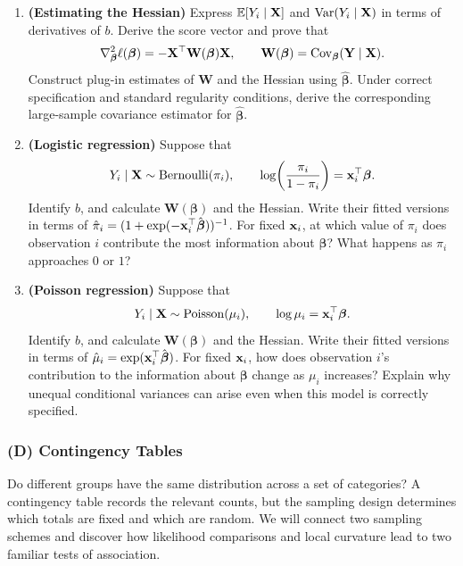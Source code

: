 \begin{enumerate}[label=\textcolor{AccentInk}{\sffamily\bfseries C\arabic*.},
                  ref=C\arabic*,leftmargin=2.65em,labelsep=0.65em,itemsep=1em]
\item \textbf{(Estimating the Hessian)}
Express $\mathbb E[Y_i\mid\mathbf{X}]$ and $\operatorname{Var}(Y_i\mid\mathbf{X})$ in terms
of derivatives of $b$. Derive the score vector and prove that
\[
    \nabla_{\boldsymbol\beta}^2\ell(\boldsymbol\beta)
    =-\mathbf{X}^\top\mathbf W(\boldsymbol\beta)\mathbf{X},
    \qquad
    \mathbf W(\boldsymbol\beta)
    =\operatorname{Cov}_{\boldsymbol\beta}(\mathbf{Y}\mid\mathbf{X}).
\]
Construct plug-in estimates of $\mathbf W$ and the Hessian using
$\hat{\boldsymbol\beta}$. Under correct specification and standard regularity
conditions, derive the corresponding large-sample covariance estimator for
$\hat{\boldsymbol\beta}$.

\item \textbf{(Logistic regression)}
Suppose that
\[
    Y_i\mid\mathbf{X}\sim\operatorname{Bernoulli}(\pi_i),
    \qquad \log\!\left(\frac{\pi_i}{1-\pi_i}\right)
       =\mathbf{x}_i^\top\boldsymbol\beta.
\]
Identify $b$, and calculate $\mathbf W(\boldsymbol\beta)$ and the Hessian.
Write their fitted versions in terms of
$\hat\pi_i=(1+\exp(-\mathbf{x}_i^\top\hat{\boldsymbol\beta}))^{-1}$.
For fixed $\mathbf{x}_i$, at which value of $\pi_i$ does observation $i$ contribute
the most information about $\boldsymbol\beta$? What happens as $\pi_i$
approaches $0$ or $1$?

\item \textbf{(Poisson regression)}
Suppose that
\[
    Y_i\mid\mathbf{X}\sim\operatorname{Poisson}(\mu_i),
    \qquad \log\mu_i=\mathbf{x}_i^\top\boldsymbol\beta.
\]
Identify $b$, and calculate $\mathbf W(\boldsymbol\beta)$ and the Hessian.
Write their fitted versions in terms of
$\hat\mu_i=\exp(\mathbf{x}_i^\top\hat{\boldsymbol\beta})$.
For fixed $\mathbf{x}_i$, how does observation $i$'s contribution to the information
about $\boldsymbol\beta$ change as $\mu_i$ increases? Explain why unequal
conditional variances can arise even when this model is correctly specified.
\end{enumerate}

\subsubsection*{(D) Contingency Tables}
{}
\label{ex:contingency-tables}

Do different groups have the same distribution across a set of categories?
A contingency table records the relevant counts, but the sampling design
determines which totals are fixed and which are random. We will connect two
sampling schemes and discover how likelihood comparisons and local curvature
lead to two familiar tests of association.

